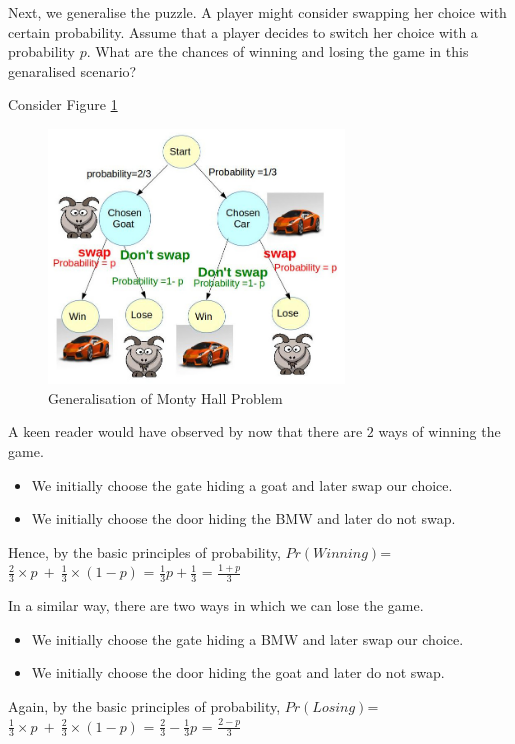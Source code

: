 \documentclass{book}
\begin{document}
Next, we generalise the puzzle. A player might consider swapping her choice with certain probability. Assume that a player decides to switch her choice with a probability $p$. What are the chances of winning and losing the game in this genaralised scenario?

Consider Figure \ref{modi}
\begin{figure}[h!]
\centering
\includegraphics[width=0.7\textwidth]{goat.jpg}
\caption{Generalisation of Monty Hall Problem}
\label{modi}
\end{figure}

A keen reader would have observed by now that there are $2$ ways of winning the game.
\begin{itemize}
\item We initially choose the gate hiding a goat and later swap our choice. 
\item We initially choose the door hiding the BMW and later do not swap.
\end{itemize}

Hence, by the basic principles of probability, $Pr(Winning)$= $\frac{2}{3} \times p\ +\ \frac{1}{3} \times (1-p)$
= $\frac{1}{3}p + \frac{1}{3}$
= $\frac{1+p}{3}$

In a similar way, there are two ways in which we can lose the game.
\begin{itemize}
\item We initially choose the gate hiding a BMW and later swap our choice. 
\item We initially choose the door hiding the goat and later do not swap.
\end{itemize}

Again, by the basic principles of probability, $Pr(Losing)$= $\frac{1}{3} \times p\ +\ \frac{2}{3} \times (1-p)$
= $\frac{2}{3} - \frac{1}{3}p$
= $\frac{2-p}{3}$
\end{document}
